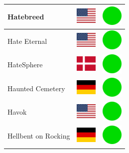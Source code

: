\documentclass[12pt, a4paper, twoside]{report}
\begin{document}
\begin{center}
\begin{longtable}{|p{5cm}|p{2cm}|p{2cm}|}
 Hatebreed                                                  & \includegraphics[width=1cm]{../4x3/us} &   \includegraphics[width=1cm]{../likes/y} \\ \hline
 Hate Eternal                                               & \includegraphics[width=1cm]{../4x3/us} &   \includegraphics[width=1cm]{../likes/y} \\ \hline
 HateSphere                                                 & \includegraphics[width=1cm]{../4x3/dk} &   \includegraphics[width=1cm]{../likes/y} \\ \hline
 Haunted Cemetery                                           & \includegraphics[width=1cm]{../4x3/de} &   \includegraphics[width=1cm]{../likes/y} \\ \hline
 Havok                                                      & \includegraphics[width=1cm]{../4x3/us} &   \includegraphics[width=1cm]{../likes/y} \\ \hline
 Hellbent on Rocking                                        & \includegraphics[width=1cm]{../4x3/de} &   \includegraphics[width=1cm]{../likes/y} \\ \hline

\end{longtable}
\end{center}
\end{document}
